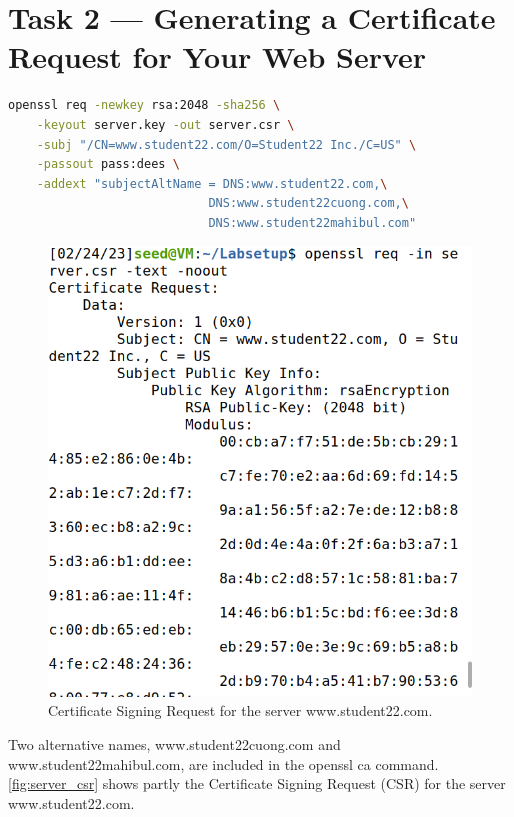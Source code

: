 \section{Task 2 --- Generating a Certificate Request for Your Web Server}
%
\begin{lstlisting}[language=bash,caption=A command generating CSR for the server]
openssl req -newkey rsa:2048 -sha256 \
    -keyout server.key -out server.csr \
    -subj "/CN=www.student22.com/O=Student22 Inc./C=US" \
    -passout pass:dees \
    -addext "subjectAltName = DNS:www.student22.com,\
                            DNS:www.student22cuong.com,\
                            DNS:www.student22mahibul.com"
\end{lstlisting}

\begin{figure}
    \centering
    \includegraphics[height=\textheight,width=\textwidth,keepaspectratio]
    {figures/server_csr.png}
    \caption{Certificate Signing Request for the server
    {\selectfont www.student22.com}.}
    \label{fig:server_csr}
\end{figure}

Two alternative names, {\selectfont www.student22cuong.com} and
{\selectfont www.student22mahibul.com}, are included
in the {\fontfamily{qcr}\selectfont openssl ca} command.
\autoref{fig:server_csr} shows partly the Certificate Signing Request
(CSR) for the server {\fontfamily{qcr}\selectfont www.student22.com}.